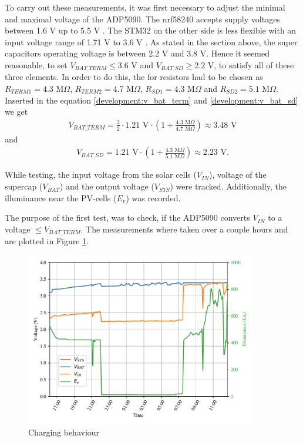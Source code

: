 To carry out these measurements, it was first necessary to adjust the minimal and maximal voltage of the ADP5090.
The nrf58240 accepts supply voltages between 1.6 V up to 5.5 V \cite{nrf}.
The STM32 on the other side is less flexible with an input voltage range of 1.71 V to 3.6 V \cite{stm32}.
As stated in the section above, the super capacitors operating voltage is between 2.2 V and 3.8 V.
Hence it seemed reasonable, to set $V_{BAT\_TERM} \le 3.6$ V and $V_{BAT\_SD} \ge 2.2$ V, to satisfy all of these three elements.
In order to do this, the for resistors had to be chosen as $R_{TERM1} = 4.3$ M$\Omega$, $R_{TERM2} = 4.7$ M$\Omega$, $R_{SD1} = 4.3$ M$\Omega$ and $R_{SD2} = 5.1$ M$\Omega$.
Inserted in the equation \eqref{development:v_bat_term} and \eqref{development:v_bat_sd} we get
\begin{align*}
	V_{BAT\_TERM}= \frac{3}{2}\cdot 1.21\text{ V}\cdot \left(1 + \frac{4.3 \text{ M}\Omega}{4.7 \text{ M}\Omega} \right) \approx 3.48 \text{ V} 
\end{align*}
and
\begin{align*}
	V_{BAT\_SD} = 1.21 \text{ V}\cdot \left(1 + \frac{4.3 \text{ M}\Omega}{5.1 \text{ M}\Omega} \right) \approx 2.23 \text{ V}. 
\end{align*}

While testing, the input voltage from the solar cells ($V_{IN}$), voltage of the supercap ($V_{BAT}$) and the output voltage ($V_{SYS}$) were tracked. Additionally, the illuminance near the PV-cells ($E_v$) was recorded.

The purpose of the first test, was to check, if the ADP5090 converts $V_{IN}$ to a voltage $\le V_{BAT\_TERM}$.
The measurements where taken over a couple hours and are plotted in Figure \ref{development:charge}.

\begin{figure}[h]
	\centering
	\includegraphics[width=0.9\textwidth]{5-development/hardware/graphics/laden.pdf}
	\caption{Charging behaviour\label{development:charge}}
\end{figure}

